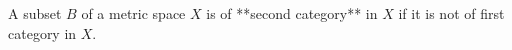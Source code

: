 A subset $B$ of a metric space $X$ is of **second category** in $X$ if it is not of first category in $X$.
